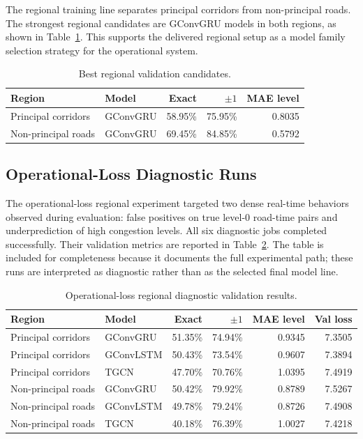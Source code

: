 The regional training line separates principal corridors from non-principal roads. The strongest regional candidates are GConvGRU models in both regions, as shown in Table~\ref{tab:regional-validation-summary}. This supports the delivered regional setup as a model family selection strategy for the operational system.

\begin{table}[htbp]
\centering
\caption{Best regional validation candidates.}
\label{tab:regional-validation-summary}
\begin{tabular}{llrrr}
\hline
Region & Model & Exact & $\pm1$ & MAE level \\
\hline
Principal corridors & GConvGRU & 58.95\% & 75.95\% & 0.8035 \\
Non-principal roads & GConvGRU & 69.45\% & 84.85\% & 0.5792 \\
\hline
\end{tabular}
\end{table}

\subsection{Operational-Loss Diagnostic Runs}

The operational-loss regional experiment targeted two dense real-time behaviors observed during evaluation: false positives on true level-0 road-time pairs and underprediction of high congestion levels. All six diagnostic jobs completed successfully. Their validation metrics are reported in Table~\ref{tab:oploss-validation-summary}. The table is included for completeness because it documents the full experimental path; these runs are interpreted as diagnostic rather than as the selected final model line.

\begin{table}[htbp]
\centering
\caption{Operational-loss regional diagnostic validation results.}
\label{tab:oploss-validation-summary}
\begin{tabular}{llrrrr}
\hline
Region & Model & Exact & $\pm1$ & MAE level & Val loss \\
\hline
Principal corridors & GConvGRU & 51.35\% & 74.94\% & 0.9345 & 7.3505 \\
Principal corridors & GConvLSTM & 50.43\% & 73.54\% & 0.9607 & 7.3894 \\
Principal corridors & TGCN & 47.70\% & 70.76\% & 1.0395 & 7.4919 \\
Non-principal roads & GConvGRU & 50.42\% & 79.92\% & 0.8789 & 7.5267 \\
Non-principal roads & GConvLSTM & 49.78\% & 79.24\% & 0.8726 & 7.4908 \\
Non-principal roads & TGCN & 40.18\% & 76.39\% & 1.0027 & 7.4218 \\
\hline
\end{tabular}
\end{table}

